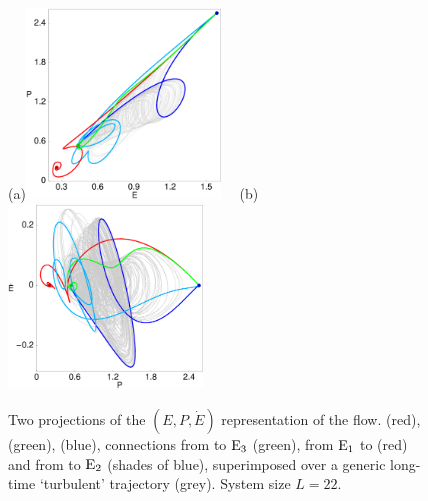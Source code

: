\begin{figure}[t]
\begin{center}
(a)\!\!\!\!\includegraphics[width=0.46\textwidth]{figs/connEP.eps}%
~~(b)\!\!\!\!\includegraphics[width=0.46\textwidth]{figs/connPEdot.eps}
\end{center}
\caption{
Two projections of the $(E,P,\dot{E})$ representation of the flow.
 (red),  (green),  (blue),
connections from  to $\mathrm{E}_{3}$ (green),
from $\mathrm{E}_{1}$ to  (red)
and from  to $\mathrm{E}_{2}$ (shades of blue), superimposed over
a generic long-time `turbulent' trajectory (grey).
System size $L=22$.
        }
\label{f:drivedragConn}
\end{figure}

